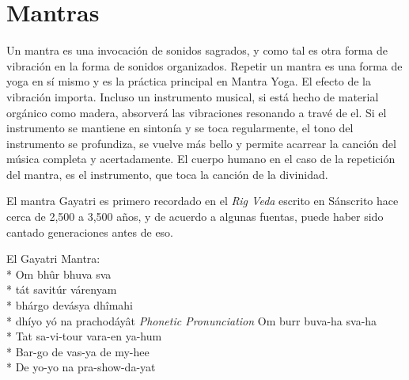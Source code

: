 \section{Mantras}
Un mantra es una invocación de sonidos sagrados, y como tal es otra forma de vibración en la forma de sonidos organizados. Repetir un mantra es una forma de yoga en sí mismo y es la práctica principal en Mantra Yoga. El efecto de la vibración importa. Incluso un instrumento musical, si está hecho de material orgánico como madera, absorverá las vibraciones resonando a travé de el. Si el instrumento se mantiene en sintonía y se toca regularmente, el tono del instrumento se profundiza, se vuelve más bello y permite acarrear la canción del música completa y acertadamente. El cuerpo humano en el caso de la repetición del mantra, es el instrumento, que toca la canción de la divinidad.

El mantra Gayatri es primero recordado en el \textit{Rig Veda} escrito en Sánscrito hace cerca de 2,500 a 3,500 años, y de acuerdo a algunas fuentas, puede haber sido cantado generaciones antes de eso.

\begin{multicols}{2}
	El Gayatri Mantra:\\*
	Om bhûr bhuva sva\\*
	tát savitúr várenyam\\*
	bhárgo devásya dhîmahi\\*
	dhíyo yó na prachodáyât
	\columnbreak
	\textit{Phonetic Pronunciation}
	Om burr buva-ha sva-ha\\*
	Tat sa-vi-tour vara-en ya-hum\\*
	Bar-go de vas-ya de my-hee\\*
	De yo-yo na pra-show-da-yat
\end{multicols}

